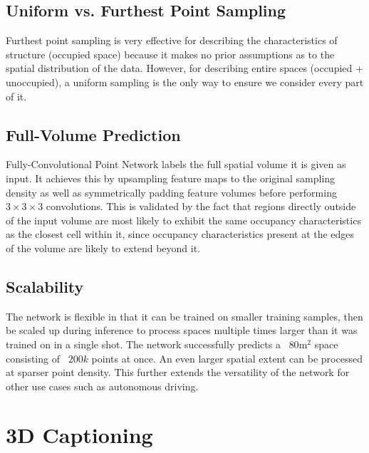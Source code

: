\documentclass[runningheads]{llncs}
\begin{document}
\subsection{Uniform vs. Furthest Point Sampling}

Furthest point sampling is very effective for describing the characteristics of structure (occupied space) because it makes no prior assumptions as to the spatial distribution of the data. However, for describing entire spaces (occupied + unoccupied), a uniform sampling is the only way to ensure we consider every part of it.



\subsection{Full-Volume Prediction}

Fully-Convolutional Point Network labels the full spatial volume it is given as input. It achieves this by upsampling feature maps to the original sampling density as well as symmetrically padding feature volumes before performing $3\times 3\times 3$ convolutions. This is validated by the fact that regions directly outside of the input volume are most likely to exhibit the same occupancy characteristics as the closest cell within it, since occupancy characteristics present at the edges of the volume are likely to extend beyond it.

\subsection{Scalability}

The network is flexible in that it can be trained on smaller training samples, then be scaled up during inference to process spaces multiple times larger than it was trained on in a single shot. The network successfully predicts a ~$80$m$^2$ space consisting of ~$200k$ points at once. An even larger spatial extent can be processed at sparser point density. This further extends the versatility of the network for other use cases such as autonomous driving.

\section{3D Captioning}
\label{section:Captioning}
\end{document}
